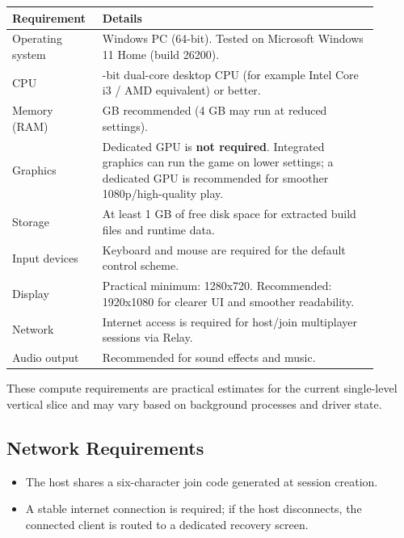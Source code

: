 \begin{table}[H]
\centering
\caption{Runtime Requirements}
\label{tab:runtime-requirements}
\begin{longtable}{|>{\centering\arraybackslash}m{0.2\linewidth}|>{\centering\arraybackslash}m{0.7\linewidth}|}
\hline
\hline
\textbf{Requirement} & \textbf{Details} \\
\hline
Operating system & Windows PC (64-bit). Tested on Microsoft Windows 11 Home (build 26200). \\
\hline
CPU & 64-bit dual-core desktop CPU (for example Intel Core i3 / AMD equivalent) or better. \\
\hline
Memory (RAM) & 8 GB recommended (4 GB may run at reduced settings). \\
\hline
Graphics & Dedicated GPU is \textbf{not required}. Integrated graphics can run the game on lower settings; a dedicated GPU is recommended for smoother 1080p/high-quality play. \\
\hline
Storage & At least 1 GB of free disk space for extracted build files and runtime data. \\
\hline
Input devices & Keyboard and mouse are required for the default control scheme. \\
\hline
Display & Practical minimum: 1280x720. Recommended: 1920x1080 for clearer UI and smoother readability. \\
\hline
Network & Internet access is required for host/join multiplayer sessions via Relay. \\
\hline
Audio output & Recommended for sound effects and music. \\
\hline
\end{longtable}
\addtocounter{table}{-1}
\end{table}

These compute requirements are practical estimates for the current single-level vertical slice and may vary based on background processes and driver state.

\subsection*{Network Requirements}
\begin{itemize}
\item The host shares a six-character join code generated at session creation.
\item A stable internet connection is required; if the host disconnects, the connected client is routed to a dedicated recovery screen.
\end{itemize}

